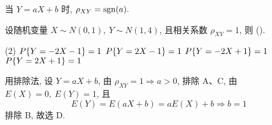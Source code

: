 \begin{theorem}
    当 $Y=aX+b$ 时, $\rho_{XY}=\mathrm{sgn}(a).$
\end{theorem}

\begin{example}
    设随机变量 $X\sim N(0,1),~Y\sim N(1,4)$, 且相关系数 $\rho_{XY}=1$, 则 (\quad).
    \begin{tasks}(2)
        \task $P\qty{Y=-2X -1}=1$
        \task $P\qty{Y=2X -1}=1$
        \task $P\qty{Y=-2X+1}=1$
        \task $P\qty{Y=2X+1}=1$
    \end{tasks}
\end{example}
\begin{solution}
    用排除法, 设 $Y=aX+b$, 由 $\rho_{XY}=1\Rightarrow a>0$, 排除 A、C,
    由 $E(X)=0,~E(Y)=1$, 且 $$E(Y)=E(aX+b)=aE(X)+b\Rightarrow b=1$$
    排除 B, 故选 D.
\end{solution}

